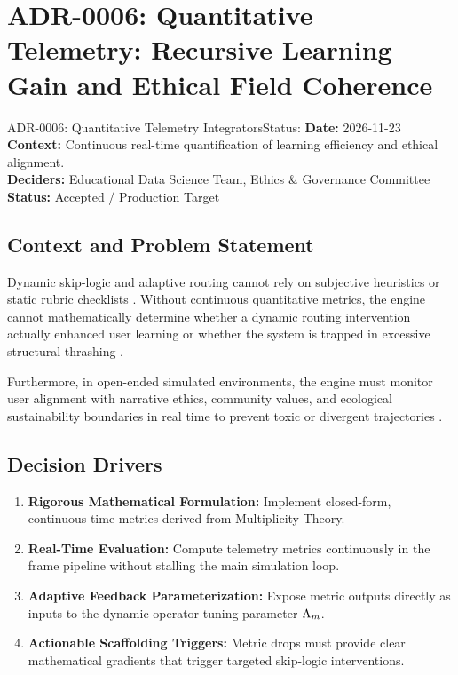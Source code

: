 \section{ADR-0006: Quantitative Telemetry: Recursive Learning Gain and Ethical Field Coherence}
\label{sec:adr0006}

\begin{adrbox}{ADR-0006: Quantitative Telemetry Integrators}{Status: }
\textbf{Date:} 2026-11-23 \\
\textbf{Context:} Continuous real-time quantification of learning efficiency and ethical alignment. \\
\textbf{Deciders:} Educational Data Science Team, Ethics \& Governance Committee \\
\textbf{Status:} Accepted / Production Target
\end{adrbox}

\subsection{Context and Problem Statement}
Dynamic skip-logic and adaptive routing cannot rely on subjective heuristics or static rubric checklists \cite{mourokh2024qari}. Without continuous quantitative metrics, the engine cannot mathematically determine whether a dynamic routing intervention actually enhanced user learning or whether the system is trapped in excessive structural thrashing \cite{kochenderfer2022algorithms}.

Furthermore, in open-ended simulated environments, the engine must monitor user alignment with narrative ethics, community values, and ecological sustainability boundaries in real time to prevent toxic or divergent trajectories \cite{mourokh2024qari}.

\subsection{Decision Drivers}
\begin{enumerate}[label=\bfseries D\arabic*.]
    \item \textbf{Rigorous Mathematical Formulation:} Implement closed-form, continuous-time metrics derived from Multiplicity Theory.
    \item \textbf{Real-Time Evaluation:} Compute telemetry metrics continuously in the frame pipeline without stalling the main simulation loop.
    \item \textbf{Adaptive Feedback Parameterization:} Expose metric outputs directly as inputs to the dynamic operator tuning parameter $\Lambda_m$.
    \item \textbf{Actionable Scaffolding Triggers:} Metric drops must provide clear mathematical gradients that trigger targeted skip-logic interventions.
\end{enumerate}

